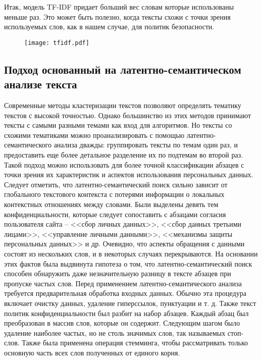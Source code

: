 \documentclass[../main]{subfiles}
\begin{document}
Итак, модель TF-IDF придает больший вес словам которые использованы меньше раз. Это может быть полезно, когда тексты схожи с точки зрения используемых слов, как в нашем случае, для политик безопасности.

\begin{figure}[H]
    \centering
    {\texttt{[image: tfidf.pdf]}}
    \vspace{-\baselineskip}
\end{figure}

\subsection{Подход основанный на латентно-семантическом анализе текста}

Современные методы кластеризации текстов позволяют определять тематику текстов с высокой точностью. Однако большинство из этих методов принимают тексты с самыми разными темами как вход для алгоритмов. Но тексты со схожими тематиками можно проанализировать с помощью ла\-тен\-тно-семантического анализа дважды: группировать тексты по темам один раз, и предоставить еще более детальное разделение их по подтемам во второй раз. Такой подход можно использовать для более точной классификации абзацев с точки зрения их характеристик и аспектов использования персональных данных. Следует отметить, что латентно-семантический поиск сильно зависит от глобального текстового контекста с потерями информации о локальных контекстных отношениях между словами. Были выделены девять тем конфиденциальности, которые следует сопоставить с абзацами согласия пользователя сайта -- <<сбор личных данных>>, <<сбор данных третьими лицами>>, <<управление личными данными>>, <<механизмы защиты персональных данных>> и др. Очевидно, что аспекты обращения с данными состоят из нескольких слов, и в некоторых случаях перекрываются. На основании этих фактов была выдвинута гипотеза о том, что латентно-семантический поиск способен обнаружить даже незначительную разницу в тексте абзацев при пропуске частых слов. Перед применением латентно-семантического анализа требуется предварительная обработка входных данных. Обычно эта процедура включает очистку данных, удаление гиперссылок, пунктуации и т. д. Также текст политик конфиденциальности был разбит на набор абзацев. Каждый абзац был преобразован в массив слов, которые он содержит. Следующим шагом было удаление наиболее частых, но не столь значимых слов, так называемых стоп-слов. Также была применена операция стемминга, чтобы рассматривать только основную часть всех слов полученных от единого корня.
\end{document}
